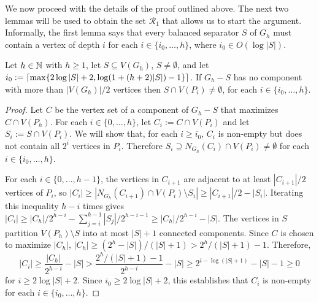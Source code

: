 \documentclass{patmorin}
\renewcommand{\ge}{\geqslant}
\renewcommand{\geq}{\geqslant}
\begin{document}
We now proceed with the details of the proof outlined above.  The next two lemmas will be used to obtain the set $\mathcal{R}_1$ that allows us to start the argument.  Informally, the first lemma says that every balanced separator $S$ of $G_h$ must contain a vertex of depth $i$ for each $i\in\{i_0,\ldots,h\}$, where $i_0\in O(\log|S|)$.

\begin{lem}\label{small_depth_separator}
  Let $h\in\mathbb{N}$ with $h\geq 1$, let $S\subseteq V(G_h)$, $S\neq\emptyset$, and let $i_0:={\lceil \max\{2\log|S|+2, \log(1+(h+2)|S|)-1\} \rceil}$.  If $G_h-S$ has no component with more than $|V(G_h)|/2$ vertices then $S\cap V(P_i)\neq\emptyset$, for each $i\in\{i_0,\ldots,h\}$.
\end{lem}

\begin{proof}
  Let $C$ be the vertex set of a component of $G_h-S$ that maximizes $C\cap V(P_h)$. For each $i\in\{0,\ldots,h\}$, let $C_i:=C\cap V(P_i)$ and let $S_i:=S\cap V(P_i)$. We will show that, for each $i\ge i_0$, $C_i$ is non-empty but does not contain all $2^i$ vertices in $P_i$.  Therefore $S_i\supseteq N_{G_h}(C_i)\cap V(P_i)\neq\emptyset$ for each $i\in\{i_0,\ldots,h\}$.

  For each $i\in\{0,\ldots,h-1\}$, the vertices in $C_{i+1}$ are adjacent to at least $|C_{i+1}|/2$ vertices of $P_{i}$, so $|C_i|\ge |N_{G_h}(C_{i+1})\cap V(P_i)\setminus S_i| \ge |C_{i+1}|/2 - |S_i|$.  Iterating this inequality $h-i$ times gives $|C_i|\ge |C_h|/2^{h-i}-\sum_{j=i}^{h-1}|S_j|/2^{h-i-1}\ge |C_h|/2^{h-i}-|S|$.  The vertices in $S$ partition $V(P_h)\setminus S$ into at most $|S|+1$ connected components.  Since $C$ is chosen to maximize $|C_h|$, $|C_h| \ge (2^h-|S|)/(|S|+1) > 2^{h}/(|S|+1) - 1$.  Therefore,
  \begin{equation}
    |C_i|\ge \frac{|C_h|}{2^{h-i}} - |S| > \frac{2^h/(|S|+1)-1}{2^{h-i}} - |S|
    \ge 2^{i-\log(|S|+1)}-|S|-1 \ge 0
  \end{equation}
  for $i\ge 2\log |S|+2$.  Since $i_0\ge 2\log |S|+2$, this establishes that $C_i$ is non-empty for each $i\in\{i_0,\ldots,h\}$.


\end{proof}
\end{document}
